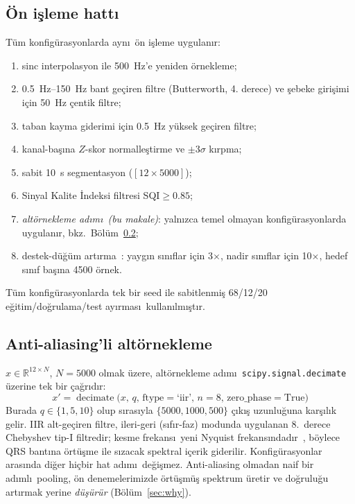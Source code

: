 \documentclass[conference]{IEEEtran}
\begin{document}
\subsection{\"{O}n i\c{s}leme hatt\i}
T\"{u}m konfig\"{u}rasyonlarda ayn\i\ \"{o}n i\c{s}leme uygulan\i r:
\begin{enumerate}
  \item sinc interpolasyon ile \SI{500}{\hertz}'e yeniden \"{o}rnekleme;
  \item \SIrange{0,5}{150}{\hertz} bant ge\c{c}iren filtre (Butterworth, 4. derece) ve
        \c{s}ebeke giri\c{s}imi i\c{c}in \SI{50}{\hertz} \c{c}entik filtre;
  \item taban kayma giderimi i\c{c}in \SI{0,5}{\hertz} y\"{u}ksek ge\c{c}iren filtre;
  \item kanal-ba\c{s}\i na $Z$-skor normalle\c{s}tirme ve $\pm 3\sigma$ k\i rpma;
  \item sabit \SI{10}{\second} segmentasyon ($[12 \times \num{5000}]$);
  \item Sinyal Kalite \.{I}ndeksi filtresi SQI${} \geq \num{0,85}$;
  \item \emph{alt\"{o}rnekleme ad\i m\i\ (bu makale)}: yaln\i zca temel
        olmayan konfig\"{u}rasyonlarda uygulan\i r,
        bkz.\ B\"{o}l\"{u}m~\ref{sec:dec};
  \item destek-d\"{u}\u{g}\"{u}m art\i rma~\cite{xu2022}: yayg\i n s\i n\i flar
        i\c{c}in 3$\times$, nadir s\i n\i flar i\c{c}in 10$\times$, hedef
        s\i n\i f ba\c{s}\i na \num{4500} \"{o}rnek.
\end{enumerate}
T\"{u}m konfig\"{u}rasyonlarda tek bir seed ile sabitlenmi\c{s} 68/12/20
e\u{g}itim/do\u{g}rulama/test ay\i rmas\i\ kullan\i lm\i\c{s}t\i r.

\subsection{Anti-aliasing'li alt\"{o}rnekleme}
\label{sec:dec}
$x\in\mathbb{R}^{12\times N}$, $N=\num{5000}$ olmak \"{u}zere, alt\"{o}rnekleme
ad\i m\i\ \texttt{scipy.signal.decimate}~\cite{scipy2020} \"{u}zerine tek bir
\c{c}a\u{g}r\i d\i r:
\begin{equation}
x' = \operatorname{decimate}\!\bigl(x,\, q,\,
   \text{ftype}=\text{`iir'},\, n=8,\,
   \text{zero\_phase}=\text{True}\bigr)
\end{equation}
Burada $q\in\{1,5,10\}$ olup s\i ras\i yla
$\{\num{5000}, \num{1000}, \num{500}\}$ \c{c}\i k\i\c{s} uzunlu\u{g}una
kar\c{s}\i l\i k gelir. IIR alt-ge\c{c}iren filtre, ileri-geri (s\i f\i r-faz)
modunda uygulanan 8.\ derece Chebyshev tip-I filtredir; kesme frekans\i\
yeni Nyquist frekans\i ndad\i r~\cite{nyquist1928,oppenheim2009},
b\"{o}ylece QRS bant\i na \"{o}rt\"{u}\c{s}me ile s\i zacak spektral i\c{c}erik
giderilir. Konfig\"{u}rasyonlar aras\i nda di\u{g}er hi\c{c}bir hat ad\i m\i\
de\u{g}i\c{s}mez. Anti-aliasing olmadan naif bir ad\i ml\i\ pooling, \"{o}n
denemelerimizde \"{o}rt\"{u}\c{s}m\"{u}\c{s} spektrum \"{u}retir ve do\u{g}rulu\u{g}u
art\i rmak yerine \emph{d\"{u}\c{s}\"{u}r\"{u}r} (B\"{o}l\"{u}m~\ref{sec:why}).
\end{document}
